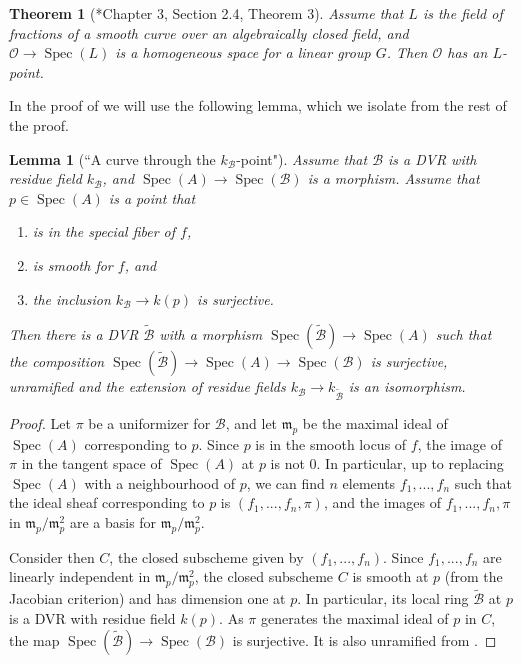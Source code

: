 \documentclass{amsart}
\newcommand{\km}{\mathfrak{m}}
\newcommand{\cB}{\mathcal{B}}
\newcommand{\cO}{\mathcal{O}}
\newcommand{\qR}{\cB}
\newcommand{\spec}{\operatorname{Spec}}
\newtheorem{Teo}[theorem]{Theorem}
\newtheorem{Lemma}[theorem]{Lemma}
\theoremstyle{definition}
\begin{document}
\begin{Teo}[\cite{Galois_cohom}*{Chapter 3, Section 2.4, Theorem 3}]\label{theorem homogeneous space has a point}Assume that $L$ is the field of fractions of a smooth curve over an algebraically closed field, and $\cO\to \spec(L)$ is a homogeneous space for a linear group $G$. Then $\cO$ has an $L$-point.
\end{Teo}
In the proof of  we will use the following lemma, which we isolate from the rest of the proof.
\begin{Lemma}[``A curve through the $k_\qR$-point"]\label{lemma a curve through the pt}
Assume that $\qR$ is a DVR with residue field $k_\qR$, and $\spec(A)\to \spec(\qR)$ is a morphism. Assume that $p\in \spec(A)$ is a point that
\begin{enumerate}
    \item is in the special fiber of $f$, 
    \item is smooth for $f$, and
    \item the inclusion $k_\qR\to k(p)$ is surjective.
\end{enumerate} 
Then there is a DVR $\widetilde{\qR}$ with a morphism $\spec(\widetilde{\qR})\to \spec(A)$ such that the composition $\spec(\widetilde{\qR})\to \spec(A)\to \spec(\qR)$ is surjective, unramified and the extension of residue fields $k_\qR\to k_{\widetilde{\qR}}$ is an isomorphism.
\end{Lemma}
\begin{proof}Let $\pi$ be a uniformizer for $\qR$, and let $\km_p$ be the maximal ideal of $\spec(A)$ corresponding to $p$.
Since $p$ is in the smooth locus of $f$, the image of $\pi$ in the tangent space of $\spec(A)$ at $p$ is not 0. In particular, up to replacing $\spec(A)$ with a neighbourhood of $p$, we can find $n$ elements $f_1,...,f_n$ such that the ideal sheaf corresponding to $p$ is $(f_1,...,f_n,\pi)$, and the images of $f_1,...,f_n,\pi$ in $\km_p/\km^2_p$ are a basis for $\km_p/\km^2_p$. 

Consider then $C$, the closed 
subscheme given by $(f_1,...,f_n)$. Since $f_1,...,f_n$ are linearly independent in $\km_p/\km^2_p$, the closed subscheme $C$ is smooth at $p$ (from the Jacobian criterion) and has dimension one at $p$. In particular, its local ring $\widetilde{\qR}$ at $p$ is a DVR with residue field $k(p)$. As $\pi$ generates the maximal ideal of $p$ in $C$, the map $\spec(\widetilde{\qR})\to \spec(\qR)$ is surjective. It is also unramified from . 
\end{proof}
\end{document}
